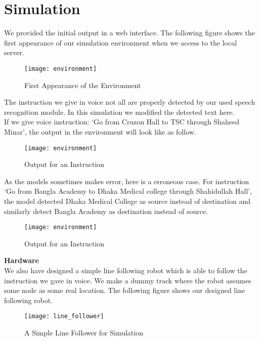 \chapter{Simulation}
	We provided the initial output in a web interface. The following figure shows the first appearance of our simulation environment when we access to the local server. \\
	
	\begin{figure}[H]
		\centering
		\texttt{[image: environment]}
		\caption{First Appearance of the Environment}
	\end{figure}
	\vline
	
	The instruction we give in voice not all are properly detected by our used speech recognition module. In this simulation we modified the detected text here.\\
	
	If we give voice instruction: `Go from Cruzon Hall to TSC through Shaheed Minar', the output in the environment will look like as follow. \\
	\begin{figure}[H]
		\centering
		\texttt{[image: environment]}
		\caption{Output for an Instruction}
	\end{figure}
	\vline
	
	As the models sometimes makes error, here is a erroneous case. For instruction `Go from Bangla Academy to Dhaka Medical college through Shahidullah Hall', the model detected Dhaka Medical College as source instead of destination and similarly detect Bangla Academy as destination instead of source. \\
	\begin{figure}[H]
		\centering
		\texttt{[image: environment]}
		\caption{Output for an Instruction}
	\end{figure}
	\vline
	
	\textbf{Hardware} \\
	We also have designed a simple line following robot which is able to follow the instruction we gave in voice. We make a dummy track where the robot assumes some node as some real location. The following figure shows our designed line following robot.
	\begin{figure}[H]
		\centering
		\texttt{[image: line\_follower]}
		\caption{A Simple Line Follower for Simulation}
	\end{figure}
	\vline